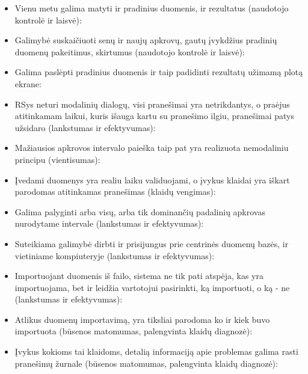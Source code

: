 \begin{itemize}
  \item Vienu metu galima matyti ir pradinius duomenis, ir rezultatus
  (naudotojo kontrolė ir laisvė):

  \item Galimybė suskaičiuoti senų ir naujų apkrovų, gautų įvykdžius pradinių
  duomenų pakeitimus, skirtumus (naudotojo kontrolė ir laisvė):

  \item Galima paslėpti pradinius duomenis ir taip padidinti rezultatų užimamą
  plotą ekrane:

  \item RSys neturi modalinių dialogų, visi pranešimai yra netrikdantys, o praėjus
  atitinkamam laikui, kuris išauga kartu su pranešimo ilgiu, pranešimai patys užsidaro
  (lankstumas ir efektyvumas):

  \item Mažiausios apkrovos intervalo paieška taip pat yra realizuota nemodaliniu principu
  (vientisumas):

  \item Įvedami duomenys yra realiu laiku validuojami, o įvykus klaidai yra iškart parodomas
  atitinkamas pranešimas (klaidų vengimas):

  \item Galima palyginti arba visų, arba tik dominančių padalinių apkrovas nurodytame intervale
  (lankstumas ir efektyvumas):

  \item Suteikiama galimybė dirbti ir prisijungus prie centrinės duomenų bazės, ir vietiniame
  kompiuteryje (lankstumas ir efektyvumas):

  \item Importuojant duomenis iš failo, sistema ne tik pati atspėja, kas yra importuojama,
  bet ir leidžia vartotojui pasirinkti, ką importuoti, o ką - ne (lankstumas ir efektyvumas):

  \item Atlikus duomenų importavimą, yra tiksliai parodoma ko ir kiek buvo importuota
  (būsenos matomumas, palengvinta klaidų diagnozė):

  \item Įvykus kokioms tai klaidoms, detalią informaciją apie problemas galima rasti
  pranešimų žurnale (būsenos matomumas, palengvinta klaidų diagnozė):
\end{itemize}
